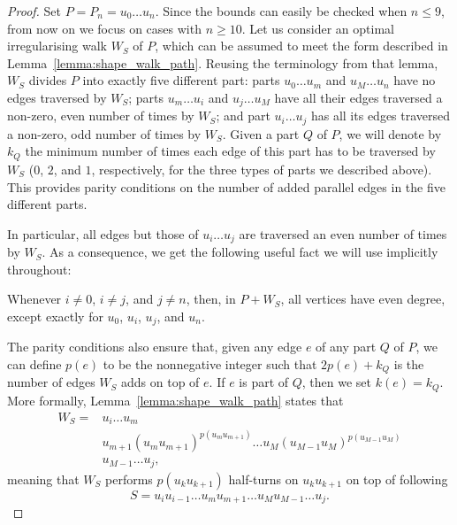 \documentclass[a4paper,11pt,dvipsnames]{elsarticle}
\newcommand{\paul}[1]{\todo[size=\tiny,color=orange!20!white]{\textbf{Paul:} #1}}
\begin{document}
\begin{proof}
Set $P=P_n=u_0 \dots u_{n}$.
Since the bounds can easily be checked when $n \leq 9$, from now on we focus on cases with $n \geq 10$.
Let us consider an optimal irregularising walk $W_S$ of $P$, which can be assumed to meet the form described in Lemma~\ref{lemma:shape_walk_path}. Reusing the terminology from that lemma, $W_S$ divides $P$ into exactly five different part: parts $u_0\dots u_m$ and $u_M\dots u_{n}$ have no edges traversed by $W_S$; parts $u_m\dots u_i$ and $u_j\dots u_M$ have all their edges traversed a non-zero, even number of times by $W_S$;
and part $u_i\dots u_j$ has all its edges traversed a non-zero, odd number of times by $W_S$. Given a part $Q$ of $P$,
we will denote by $k_Q$ the minimum number of times each edge of this part has to be traversed by $W_S$ ($0$, $2$, and $1$, respectively, for the three types of parts we described above). This provides parity conditions
on the number of added parallel edges in the five different parts.

In particular, all edges but those of $u_i\dots u_j$ are traversed an even number of times by $W_S$. As a consequence, we get the following useful fact we will use implicitly throughout:

\begin{remark}
Whenever $i \neq 0$, $i\neq j$, and $j\neq n$, then, in $P+W_S$, all vertices have even degree, except exactly for
$u_0$, $u_i$, $u_j$, and $u_n$.
\end{remark}

The parity conditions also ensure that,
given any edge $e$ of any part $Q$ of $P$, we can define $p(e)$ to be the nonnegative integer such that $2p(e)+k_Q$ is the number of edges $W_S$ adds on top of $e$. If $e$ is part of $Q$, then we set $k(e)=k_Q$.
More formally, Lemma~\ref{lemma:shape_walk_path} states that
\begin{align*}
    W_S=&u_i\dots u_m\\
    &u_{m+1}(u_mu_{m+1})^{p(u_mu_{m+1})}\dots u_{M}(u_{M-1}u_M)^{p(u_{M-1}u_M)}\\
    &u_{M-1}\dots u_j,
\end{align*} 
meaning that $W_S$ performs $p(u_ku_{k+1})$ half-turns on $u_ku_{k+1}$ on top of following
\[
    S=u_iu_{i-1}\dots u_mu_{m+1}\dots u_Mu_{M-1}\dots u_j.
\]


\end{proof}
\end{document}
